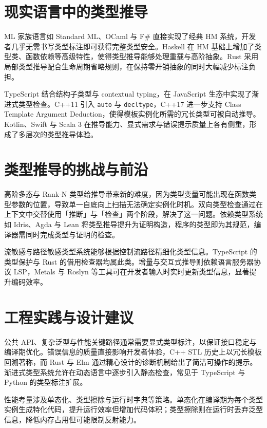 \chapter{现实语言中的类型推导}
ML 家族语言如 Standard ML、OCaml 与 F\#{} 直接实现了经典 HM 系统，开发者几乎无需书写类型标注即可获得完整类型安全。Haskell 在 HM 基础上增加了类型类、函数依赖等高级特性，使得类型推导能够处理重载与高阶抽象。Rust 采用局部类型推导配合生命周期省略规则，在保持零开销抽象的同时大幅减少标注负担。\par
TypeScript 结合结构子类型与 contextual typing，在 JavaScript 生态中实现了渐进式类型检查。C++11 引入 \texttt{auto} 与 \texttt{decltype}，C++17 进一步支持 Class Template Argument Deduction，使得模板实例化所需的冗长类型可被自动推导。Kotlin、Swift 与 Scala 3 在推导能力、显式需求与错误提示质量上各有侧重，形成了多层次的类型推导体验。\par
\chapter{类型推导的挑战与前沿}
高阶多态与 Rank-N 类型给推导带来新的难度，因为类型变量可能出现在函数类型参数的位置，导致单一自底向上扫描无法确定实例化时机。双向类型检查通过在上下文中交替使用「推断」与「检查」两个阶段，解决了这一问题。依赖类型系统如 Idris、Agda 与 Lean 将类型推导提升为证明构造，程序的类型即为其规范，编译器需同时完成类型与证明的检查。\par
流敏感与路径敏感类型系统能够根据控制流路径精细化类型信息。TypeScript 的类型保护与 Rust 的借用检查器均属此类。增量与交互式推导则依赖语言服务器协议 LSP，Metals 与 Roslyn 等工具可在开发者输入时实时更新类型信息，显著提升编码效率。\par
\chapter{工程实践与设计建议}
公共 API、复杂泛型与性能关键路径通常需要显式类型标注，以保证接口稳定与编译期优化。错误信息的质量直接影响开发者体验，C++ STL 历史上以冗长模板回溯著称，而 Rust 与 Elm 通过精心设计的诊断机制给出了简洁可操作的提示。渐进式类型系统允许在动态语言中逐步引入静态检查，常见于 TypeScript 与 Python 的类型标注扩展。\par
性能考量涉及单态化、类型擦除与运行时字典等策略。单态化在编译期为每个类型实例生成特化代码，提升运行效率但增加代码体积；类型擦除则在运行时丢弃泛型信息，降低内存占用但可能限制反射能力。\par
